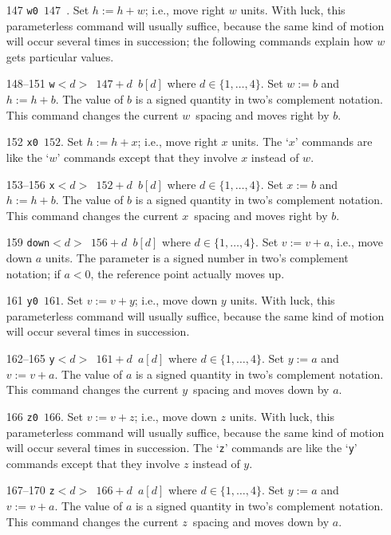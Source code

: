 \documentclass[10pt, a4paper]{article}
\begin{document}
\begin{itemize}
\item[147] \texttt{w0 $147$ }. 
Set $h:=h+w$; i.e., move right $w$ units. With luck,
this parameterless command will usually suffice, because the same kind of motion
will occur several times in succession; the following commands explain how
$w$ gets particular values. 

\item[148--151] \texttt{w$<d>$ $147+d$ $b[d]$} where $d\in\{1,\dots,4\}$. 
Set $w:=b$ and $h:=h+b$. 
The value of $b$ is a signed quantity in two's complement notation. 
This command changes the current $w$~spacing and moves right by $b$.


\item[152] \texttt{x0 $152$}. 
Set $h:=h+x$; i.e., move right $x$ units. The `$x$'
commands are like the `$w$' commands except that they involve $x$ instead
of $w$.

\item[153--156] \texttt{x$<d>$ $152+d$ $b[d]$} where $d\in\{1,\dots,4\}$. 
Set $x:=b$ and $h:=h+b$. 
The value of $b$ is a signed quantity in two's complement notation. 
This command changes the current $x$~spacing and moves right by $b$.


\item[159] \texttt{down$<d>$ $156+d$ $b[d]$} where $d\in\{1,\dots,4\}$. 
Set $v:=v+a$, i.e., move down $a$ units. 
The parameter is a signed number in two's complement notation; 
if $a<0$, the reference point actually moves up.


\item[161] \texttt{y0 $161$}. 
Set $v:=v+y$; i.e., move down $y$ units. 
With luck, this parameterless command will usually suffice, 
because the same kind of motion will occur several times in succession.

\item[162--165] \texttt{y$<d>$ $161+d$ $a[d]$} where $d\in\{1,\dots,4\}$. 
Set $y:=a$ and $v:=v+a$. 
The value of $a$ is a signed quantity in two's complement notation. 
This command changes the current $y$~spacing and moves down by $a$. 

\item[166] \texttt{z0 $166$}. 
Set $v:=v+z$; i.e., move down $z$ units. 
With luck, this parameterless command will usually suffice, 
because the same kind of motion will occur several times in succession.
The `\texttt{z}' commands are like the `\texttt{y}' commands 
except that they involve $z$ instead of $y$. 

\item[167--170] \texttt{z$<d>$ $166+d$ $a[d]$} where $d\in\{1,\dots,4\}$. 
Set $y:=a$ and $v:=v+a$. 
The value of $a$ is a signed quantity in two's complement notation. 
This command changes the current $z$~spacing and moves down by $a$. 



\end{itemize}
\end{document}
